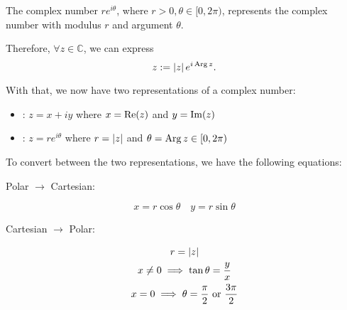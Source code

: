\documentclass[notoc,notitlepage]{tufte-book}
\begin{document}
\begin{remark}
	The complex number $re^{i \theta}$, where $r > 0, \theta \in [0, 2\pi)$, represents the complex number with modulus $r$ and argument $\theta$.
	\begin{center}
	\end{center}

	Therefore, $\forall z \in \mathbb{C}$, we can express
	\begin{equation}\label{eq:polar representation of a complex number}
		z := \left|z\right| e^{i \operatorname{Arg} z}.
	\end{equation}
\end{remark}

With that, we now have two representations of a complex number:
\begin{itemize}
	\item {}: $z = x + iy$ where $x = \operatorname{Re}(z)$ and $y = \operatorname{Im}(z)$
	\item {}: $z = re^{i \theta}$ where $r = \left|z\right|$ and $\theta = \operatorname{Arg} z \in [0, 2\pi)$
\end{itemize}

To convert between the two representations, we have the following equations:

Polar $\to$ Cartesian:

\begin{equation}\label{eq:polar to cartesian}
	x = r \cos \theta \quad y = r \sin \theta
\end{equation}

Cartesian $\to$ Polar:

\begin{gather}\label{eq:cartesian to polar}
	r = \left|z\right| \nonumber \\
	x \neq 0 \implies \tan \theta = \frac{y}{x} \\
	x = 0 \implies \theta = \frac{\pi}{2} \text{ or } \frac{3\pi}{2} \nonumber
\end{gather}
\end{document}
